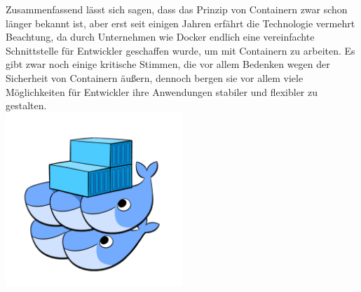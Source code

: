 \noindent Zusammenfassend lässt sich sagen, dass das Prinzip von Containern zwar schon länger bekannt ist, aber erst seit einigen Jahren erfährt die Technologie vermehrt Beachtung, da durch Unternehmen wie Docker endlich eine vereinfachte Schnittstelle für Entwickler geschaffen wurde, um mit Containern zu arbeiten. Es gibt zwar noch einige kritische Stimmen, die vor allem Bedenken wegen der Sicherheit von Containern äußern, dennoch bergen sie vor allem viele Möglichkeiten für Entwickler ihre Anwendungen stabiler und flexibler zu gestalten.\\

\centering
\includegraphics[width=0.5\textwidth]{images/docker-swarm-hero2.png}
